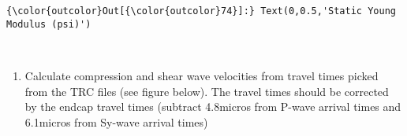\documentclass[11pt]{article}
\providecommand{\tightlist}{%
      \setlength{\itemsep}{0pt}\setlength{\parskip}{0pt}}
\begin{document}
\begin{Verbatim}[commandchars=\\\{\}]
{\color{outcolor}Out[{\color{outcolor}74}]:} Text(0,0.5,'Static Young Modulus (psi)')
\end{Verbatim}
            
    \begin{center}
    \end{center}
    { \hspace*{\fill} \\}
    
    \begin{enumerate}
\def\labelenumi{\arabic{enumi}.}
\setcounter{enumi}{1}
\tightlist
\item
  Calculate compression and shear wave velocities from travel times
  picked from the TRC files (see figure below). The travel times should
  be corrected by the endcap travel times (subtract 4.8micros from
  P-wave arrival times and 6.1micros from Sy-wave arrival times)
\end{enumerate}
\end{document}
